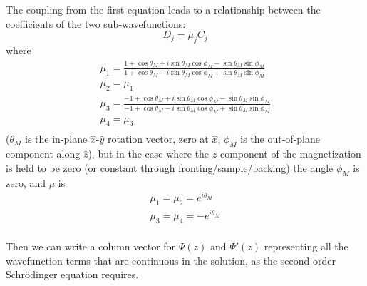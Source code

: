 \documentclass[%
 reprint,
 amsmath,
 amssymb,
 aps,
 prl,
 lengthcheck,%
]{revtex4-1}
\begin{document}
The coupling from the first equation leads to a relationship between the 
coefficients of the two sub-wavefunctions: 
\begin{equation}
  D_j = \mu_j C_j
\end{equation}
where 
\begin{equation}
\begin{array}{l}
  \mu_1 = \frac{1+\cos\theta_M+i\sin\theta_M\cos\phi_M - \sin\theta_M\sin\phi_M}
    {1+\cos\theta_M-i\sin\theta_M\cos\phi_M + \sin\theta_M\sin\phi_M} \\
  \mu_2 = \mu_1 \\
  \mu_3 = \frac{-1+\cos\theta_M+i\sin\theta_M\cos\phi_M - \sin\theta_M\sin\phi_M}
    {-1+\cos\theta_M-i\sin\theta_M\cos\phi_M + \sin\theta_M\sin\phi_M} \\
  \mu_4 = \mu_3 \\
\end{array}
\end{equation}
($\theta_M$ is the in-plane $\hat x$\nobreakdash-$\hat y$ rotation vector, zero at $\hat x$,
$\phi_M$ is the out-of-plane component along $\hat z$), 
but in the case where the $z$-component of the magnetization is held to be zero
(or constant through fronting/sample/backing) the angle $\phi_M$ is zero, and
$\mu$ is 
\begin{equation}
\begin{array}{l}
  \displaystyle \mu_1 = \mu_2 = e^{i\theta_M} \\
  \displaystyle \mu_3 = \mu_4 = -e^{i\theta_M} \\
\end{array}
\end{equation}

Then we can write a column vector for $\Psi(z)$ and $\Psi'(z)$ 
representing all the wavefunction 
terms that are continuous in the solution, as the second-order Schr\"odinger 
equation requires. 
\end{document}
